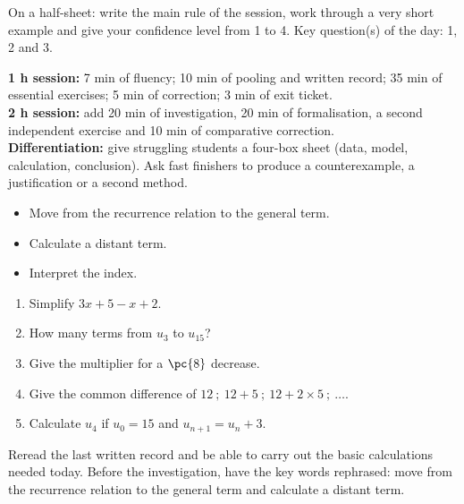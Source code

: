    \begin{exitticket}[3 minutes]On a half-sheet: write the main rule of the session, work through a very short example and give your confidence level from 1 to 4. Key question(s) of the day: 1, 2 and 3.\end{exitticket}

    \ifmxteacher
    \begin{method}
    \textbf{1 h session:} 7 min of fluency; 10 min of pooling and written record; 35 min of essential exercises; 5 min of correction; 3 min of exit ticket.\\
    \textbf{2 h session:} add 20 min of investigation, 20 min of formalisation, a second independent exercise and 10 min of comparative correction.\\
    \textbf{Differentiation:} give struggling students a four-box sheet (data, model, calculation, conclusion). Ask fast finishers to produce a counterexample, a justification or a second method.
    \end{method}
    \fi
{}
\begin{objectives}\begin{itemize}\item Move from the recurrence relation to the general term.\item Calculate a distant term.\item Interpret the index.\end{itemize}\end{objectives}
\begin{fluency}\begin{enumerate}\item Simplify $3x+5-x+2$. \item How many terms from $u_3$ to $u_{15}$? \item Give the multiplier for a $\pc{8}$ decrease. \item Give the common difference of $12\ ;\ 12+5\ ;\ 12+2\times5\ ;\ \ldots$. \item Calculate $u_4$ if $u_0=15$ and $u_{n+1}=u_n+3$. \end{enumerate}\end{fluency}
\begin{prerequisites}Reread the last written record and be able to carry out the basic calculations needed today. Before the investigation, have the key words rephrased: move from the recurrence relation to the general term and calculate a distant term.\end{prerequisites}

